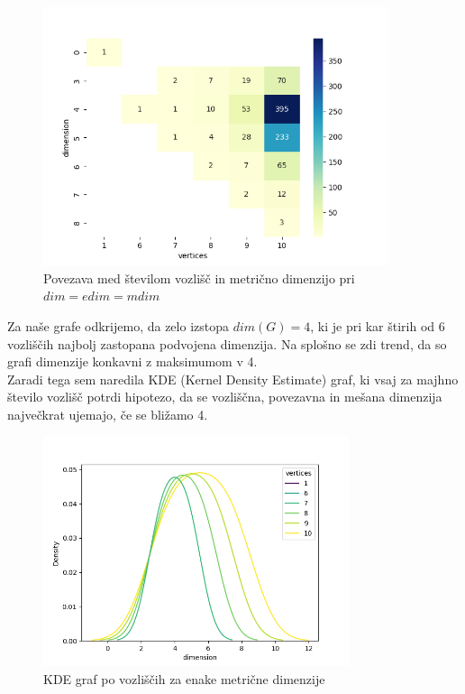 \documentclass[a4paper,12pt]{article}
\theoremstyle{definition}
\theoremstyle{remark}
\theoremstyle{definition}
\begin{document}
\begin{figure}[H]
    \centering
    \includegraphics[width=0.9\textwidth]{eq_heatmap.png}
    \caption{Povezava med številom vozlišč in metrično dimenzijo pri $dim = edim = mdim$}
\end{figure}

\indent Za naše grafe odkrijemo, da zelo izstopa $dim(G) = 4$,
ki je pri kar štirih od 6 vozliščih najbolj zastopana podvojena
dimenzija. Na splošno se zdi trend, da so grafi dimenzije konkavni
z maksimumom v 4. \\
\indent Zaradi tega sem naredila KDE (Kernel Density Estimate)
graf, ki vsaj za majhno število vozlišč potrdi hipotezo, da se vozliščna,
povezavna in mešana dimenzija največkrat ujemajo, če se bližamo 4.

\begin{figure}[H]
    \centering
    \includegraphics[width=0.8\textwidth]{eq_kdeplot.png}
    \caption{KDE graf po vozliščih za enake metrične dimenzije}
\end{figure}
\end{document}
